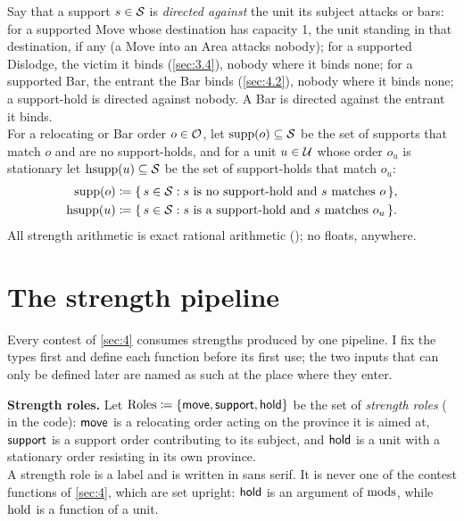 \documentclass[12pt,a4paper]{article}
\begin{document}
Say that a support $s \in \mathcal{S}$ is \emph{directed against} the unit its subject attacks or bars: for a supported Move whose destination has capacity 1, the unit standing in that destination, if any (a Move into an Area attacks nobody); for a supported Dislodge, the victim it binds (\cref{sec:3.4}), nobody where it binds none; for a supported Bar, the entrant the Bar binds (\cref{sec:4.2}), nobody where it binds none; a support-hold is directed against nobody.
A Bar is directed against the entrant it binds.\\
For a relocating or Bar order $o \in \mathcal{O}$, let $\operatorname{supp}(o) \subseteq \mathcal{S}$ be the set of supports that match $o$ and are no support-holds, and for a unit $u \in \mathcal{U}$ whose order $o_u$ is stationary let $\operatorname{hsupp}(u) \subseteq \mathcal{S}$ be the set of support-holds that match $o_u$:
\begin{align*}
\operatorname{supp}(o) &\coloneqq \{\, s \in \mathcal{S} : s \text{ is no support-hold and } s \text{ matches } o \,\}, \\
\operatorname{hsupp}(u) &\coloneqq \{\, s \in \mathcal{S} : s \text{ is a support-hold and } s \text{ matches } o_u \,\}.
\end{align*}
All strength arithmetic is exact rational arithmetic (); no floats, anywhere.

\section{The strength pipeline}\label{sec:2}

Every contest of \cref{sec:4} consumes strengths produced by one pipeline.
I fix the types first and define each function before its first use; the two inputs that can only be defined later are named as such at the place where they enter.

\textbf{Strength roles.}
Let $\mathrm{Roles} \coloneqq \{\mathsf{move}, \mathsf{support}, \mathsf{hold}\}$ be the set of \emph{strength roles} ( in the code): $\mathsf{move}$ is a relocating order acting on the province it is aimed at, $\mathsf{support}$ is a support order contributing to its subject, and $\mathsf{hold}$ is a unit with a stationary order resisting in its own province.\\
A strength role is a label and is written in sans serif.
It is never one of the contest functions of \cref{sec:4}, which are set upright: $\mathsf{hold}$ is an argument of $\operatorname{mods}$, while $\operatorname{hold}$ is a function of a unit.
\end{document}
